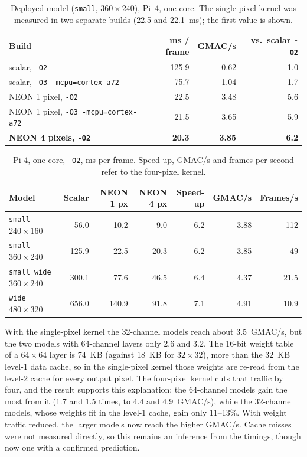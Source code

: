 \documentclass[11pt,a4paper]{article}
\newcommand{\cfg}[1]{\texttt{#1}}
\begin{document}
\begin{table}[h]
\centering
\caption{Deployed model (\cfg{small}, $360 \times 240$), Pi~4, one core.
The single-pixel kernel was measured in two separate builds (22.5 and
22.1~ms); the first value is shown.}
\label{tab:neon}
\begin{tabular}{lrrr}
\toprule
Build & ms / frame & GMAC/s & vs.\ scalar \texttt{-O2} \\
\midrule
scalar, \texttt{-O2} & 125.9 & 0.62 & 1.0 \\
scalar, \texttt{-O3 -mcpu=cortex-a72} & 75.7 & 1.04 & 1.7 \\
NEON 1 pixel, \texttt{-O2} & 22.5 & 3.48 & 5.6 \\
NEON 1 pixel, \texttt{-O3 -mcpu=cortex-a72} & 21.5 & 3.65 & 5.9 \\
\textbf{NEON 4 pixels, \texttt{-O2}} & \textbf{20.3} & \textbf{3.85} & \textbf{6.2} \\
\bottomrule
\end{tabular}
\end{table}

\begin{table}[h]
\centering
\caption{Pi 4, one core, \texttt{-O2}, ms per frame. Speed-up, GMAC/s and
frames per second refer to the four-pixel kernel.}
\label{tab:neonall}
\begin{tabular}{lrrrrrr}
\toprule
Model & Scalar & NEON 1 px & NEON 4 px & Speed-up & GMAC/s & Frames/s \\
\midrule
\cfg{small} $240 \times 160$ & 56.0 & 10.2 & 9.0 & 6.2 & 3.88 & 112 \\
\cfg{small} $360 \times 240$ & 125.9 & 22.5 & 20.3 & 6.2 & 3.85 & 49 \\
\cfg{small\_wide} $360 \times 240$ & 300.1 & 77.6 & 46.5 & 6.4 & 4.37 & 21.5 \\
\cfg{wide} $480 \times 320$ & 656.0 & 140.9 & 91.8 & 7.1 & 4.91 & 10.9 \\
\bottomrule
\end{tabular}
\end{table}

With the single-pixel kernel the 32-channel models reach about
3.5~GMAC/s, but the two models with 64-channel layers only 2.6 and 3.2. The
16-bit weight table of a $64 \times 64$ layer is \SI{74}{KB} (against
\SI{18}{KB} for $32 \times 32$), more than the \SI{32}{KB} level-1 data
cache, so in the single-pixel kernel those weights are re-read from the
level-2 cache for every output pixel. The four-pixel kernel cuts that
traffic by four, and the result supports this explanation: the 64-channel
models gain the most from it (1.7 and 1.5 times, to 4.4 and 4.9~GMAC/s),
while the 32-channel models, whose weights fit in the level-1 cache, gain
only 11--13\%. With weight traffic reduced, the larger models now reach
the higher GMAC/s.
Cache misses were not measured directly, so this remains an inference from
the timings, though now one with a confirmed prediction.
\end{document}
